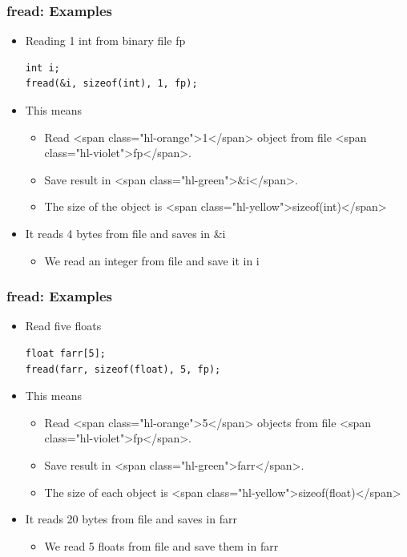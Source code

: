 \documentclass{../c-lecture}
\begin{document}
\begin{frame}
  \frametitle{fread: Examples}
  \begin{itemize}
    \item Reading 1 int from binary file fp
    \begin{verbatim}
int i;
fread(&i, sizeof(int), 1, fp);
    \end{verbatim}
    \item This means
    \begin{itemize}
      \item
        Read <span class="hl-orange">1</span> object from file
        <span class="hl-violet">fp</span>.

      \item Save result in <span class="hl-green">&i</span>.
      \item
        The size of the object is <span class="hl-yellow">sizeof(int)</span>

    \end{itemize}
    \item It reads 4 bytes from file and saves in &i
    \begin{itemize}
      \item We read an integer from file and save it in i
    \end{itemize}
  \end{itemize}
\end{frame}

\begin{frame}
  \frametitle{fread: Examples}
  \begin{itemize}
    \item Read five floats
    \begin{verbatim}
float farr[5];
fread(farr, sizeof(float), 5, fp);
    \end{verbatim}
    \item This means
    \begin{itemize}
      \item
        Read <span class="hl-orange">5</span> objects from file
        <span class="hl-violet">fp</span>.

      \item Save result in <span class="hl-green">farr</span>.
      \item
        The size of each object is
        <span class="hl-yellow">sizeof(float)</span>

    \end{itemize}
    \item It reads 20 bytes from file and saves in farr
    \begin{itemize}
      \item We read 5 floats from file and save them in farr
    \end{itemize}
  \end{itemize}
\end{frame}
\end{document}
